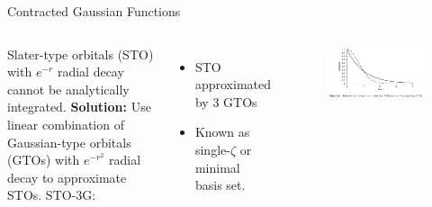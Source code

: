 \documentclass[aspectratio=169]{beamer}
\begin{document}
    \begin{frame}{Contracted Gaussian Functions}

        \begin{columns}
            Slater-type orbitals (STO) with $e^{-r}$ radial decay cannot be analytically integrated.\newline
            \newline
            \textbf{Solution: }Use linear combination of Gaussian-type orbitals (GTOs) with $e^{-r^2}$ radial decay to approximate STOs.\newline
            \newline
            STO-3G:
            \begin{itemize}
                \item STO approximated by 3 GTOs
                \item Known as single-$\zeta$ or minimal basis set.
            \end{itemize}

            \begin{figure}
                \centering
                \includegraphics[width=\linewidth]{lectures/figures/2_STO.png}
            \end{figure}
        \end{columns}

    \end{frame}
\end{document}
